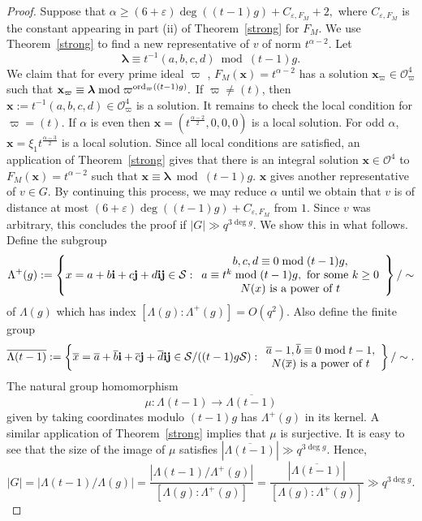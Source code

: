 \documentclass[10pt]{amsart}
\theoremstyle{plain}
\theoremstyle{plain}
\renewcommand{\vec}[1]{\mathbf{#1}}
\theoremstyle{remark}
\theoremstyle{definition}
\newcommand{\ord}{\textup{ord}}
\begin{document}
\begin{proof}
Suppose  that $\alpha\geq (6+\varepsilon)\deg ((t-1)g)+C_{\varepsilon,F_M}+2,$ where $C_{\varepsilon,F_M}$ is the constant appearing in part (ii) of Theorem~\ref{strong} for $F_M$. We  use Theorem~\ref{strong} to find a new representative of $v$ of  norm $t^{\alpha-2}$. Let  
\[
\boldsymbol{\lambda}\equiv t^{-1}(a,b,c,d) \bmod (t-1)g.
\]
We claim that for every prime ideal  $\varpi$ , $F_M(\vec{x})=t^{\alpha-2}$ has a
solution $\vec{x}_{\varpi} \in  \mathcal{O}_{\varpi}^4$ such that $\vec{x}_{\varpi}\equiv\boldsymbol{\lambda}\bmod \varpi^{\ord_{\varpi}((t-1)g)}.$ If $\varpi\neq (t)$, then $ \vec{x}:=t^{-1}(a,b,c,d)\in  \mathcal{O}_{\varpi}^4$ is a solution. It remains to check the local condition for $\varpi=(t).$ If $\alpha$ is even then $\vec{x}=(t^{\frac{\alpha-2}{2}},0,0,0)$ is a local solution. For odd $\alpha$, $\vec{x}=\xi_1t^{\frac{\alpha-3}{2}}$ is a local solution. Since all local conditions are satisfied, an application of Theorem~\ref{strong} gives that there is an integral solution $\vec{x}\in\mathcal{O}^4$ to $F_M(\vec{x})=t^{\alpha-2}$ such that $\vec{x}\equiv \boldsymbol{\lambda}\bmod (t-1)g$. $\vec{x}$ gives another representative of $v\in G$. By continuing this process, we may reduce $\alpha$ until we obtain that $v$ is of distance at most $(6+\varepsilon)\deg ((t-1)g)+C_{\varepsilon,F_M}$ from $1.$ Since $v$ was arbitrary, this concludes the proof if  $|G|\gg q^{3\deg g}$. We show this in what follows. Define the subgroup
\[\Lambda^+(g):=\left\{x=a+b\mathbf{i}+c\mathbf{j}+d\mathbf{ij}\in\mathcal{S}:\begin{array}{c}b,c,d\equiv 0\bmod{(t-1)g},\\ a\equiv t^k\bmod (t-1)g,\textup{ for some }k\geq 0\\ N(x)\ \textup{is a power of }t\end{array}\right\}/\sim\]
of $\Lambda(g)$ which has index $[\Lambda(g):\Lambda^+(g)]=O(q^2)$. Also define the finite group
\[\overline{\Lambda(t-1)}:=\left\{\overline{x}=\overline{a}+\overline{b}\mathbf{i}+\overline{c}\mathbf{j}+\overline{d}\mathbf{ij}\in\mathcal{S}/((t-1)g\mathcal{S}):\begin{array}{c}\overline{a}-1,\overline{b}\equiv 0\bmod{t-1},\\ N(\overline{x})\ \textup{is a power of }t\end{array}\right\}/\sim.\]
The natural group homomorphism
\[\mu:\Lambda(t-1)\rightarrow\overline{\Lambda(t-1)}\]
given by taking coordinates modulo $(t-1)g$ has $\Lambda^+(g)$ in its kernel. A similar application of Theorem~\ref{strong} implies that $\mu$ is surjective. It is easy to see that the size of the image of $\mu$ satisfies  $|\overline{\Lambda(t-1)}|\gg q^{3\deg g}.$ Hence,
\[
|G|=|\Lambda(t-1)/\Lambda(g)|=\frac{|\Lambda(t-1)/\Lambda^+(g)|}{[\Lambda(g):\Lambda^+(g)]}= \frac{|\overline{\Lambda(t-1)}|}{[\Lambda(g):\Lambda^+(g)]}\gg q^{3\deg g}.
\]

%
\end{proof}
\end{document}

